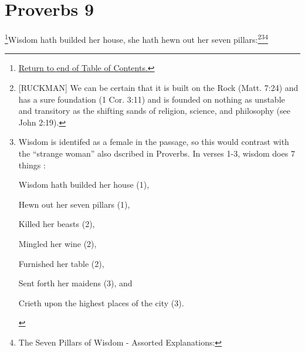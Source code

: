 \chapter{Proverbs 9}
\footnote{\textcolor[rgb]{0.00,0.25,0.00}{\hyperlink{TOC}{Return to end of Table of Contents.}}}\textcolor[rgb]{0.00,0.00,1.00}{Wisdom hath builded her house, she hath hewn out her seven pillars:}\footnote{[RUCKMAN] We can be certain that it is built on the Rock (Matt. 7:24) and has a sure foundation (1 Cor. 3:11) and is founded on nothing as unstable and transitory as the shifting sands of religion, science, and philosophy (see John 2:19).}\footnote{Wisdom is identifed as a female in the passage, so this would contrast with the ``strange woman'' also dscribed in Proverbs. In verses 1-3, wisdom does 7 things  \cite{Ruckman1972Proverbs}:
\begin{compactenum}
\item Wisdom hath builded her house (1),
\item Hewn out her seven pillars (1),
\item Killed her beasts (2),
\item Mingled her wine (2),
\item Furnished her table (2),
\item Sent forth her maidens (3), and
\item Crieth upon the highest places of the city (3).
\end{compactenum} 
}\footnote{The Seven Pillars of Wisdom - Assorted Explanations:
 }
